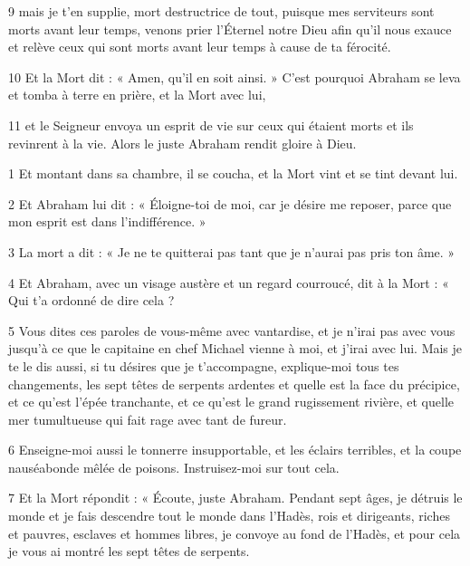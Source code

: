 \par 9 mais je t'en supplie, mort destructrice de tout, puisque mes serviteurs sont morts avant leur temps, venons prier l'Éternel notre Dieu afin qu'il nous exauce et relève ceux qui sont morts avant leur temps à cause de ta férocité.

\par 10 Et la Mort dit : « Amen, qu'il en soit ainsi. » C'est pourquoi Abraham se leva et tomba à terre en prière, et la Mort avec lui,

\par 11 et le Seigneur envoya un esprit de vie sur ceux qui étaient morts et ils revinrent à la vie. Alors le juste Abraham rendit gloire à Dieu.


\par 1 Et montant dans sa chambre, il se coucha, et la Mort vint et se tint devant lui.

\par 2 Et Abraham lui dit : « Éloigne-toi de moi, car je désire me reposer, parce que mon esprit est dans l'indifférence. »

\par 3 La mort a dit : « Je ne te quitterai pas tant que je n'aurai pas pris ton âme. »

\par 4 Et Abraham, avec un visage austère et un regard courroucé, dit à la Mort : « Qui t'a ordonné de dire cela ?

\par 5 Vous dites ces paroles de vous-même avec vantardise, et je n'irai pas avec vous jusqu'à ce que le capitaine en chef Michael vienne à moi, et j'irai avec lui. Mais je te le dis aussi, si tu désires que je t'accompagne, explique-moi tous tes changements, les sept têtes de serpents ardentes et quelle est la face du précipice, et ce qu'est l'épée tranchante, et ce qu'est le grand rugissement rivière, et quelle mer tumultueuse qui fait rage avec tant de fureur.

\par 6 Enseigne-moi aussi le tonnerre insupportable, et les éclairs terribles, et la coupe nauséabonde mêlée de poisons. Instruisez-moi sur tout cela.

\par 7 Et la Mort répondit : « Écoute, juste Abraham. Pendant sept âges, je détruis le monde et je fais descendre tout le monde dans l'Hadès, rois et dirigeants, riches et pauvres, esclaves et hommes libres, je convoye au fond de l'Hadès, et pour cela je vous ai montré les sept têtes de serpents.

